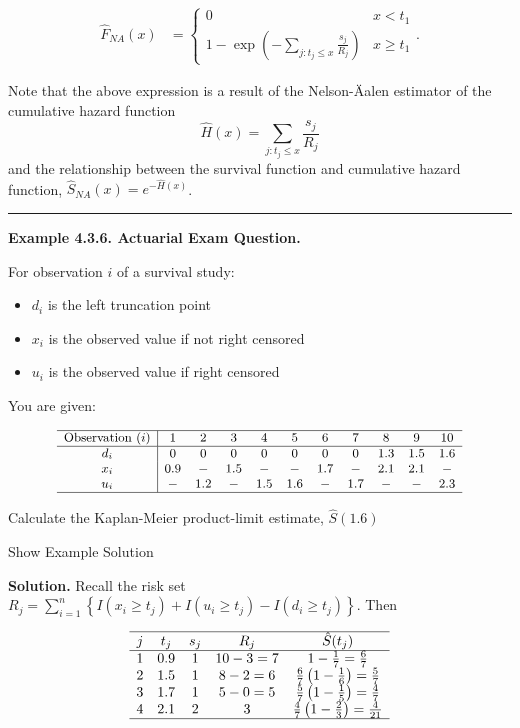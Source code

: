 \documentclass[]{book}
\providecommand{\tightlist}{%
  \setlength{\itemsep}{0pt}\setlength{\parskip}{0pt}}
\theoremstyle{definition}
\theoremstyle{definition}
\theoremstyle{definition}
\theoremstyle{remark}
\begin{document}
\[
\begin{aligned}
\hat{F}_{NA}(x) &=
\left\{
\begin{array}{ll}
0 & x<t_{1} \\
1- \exp \left(-\sum_{j:t_{j} \leq x}\frac{s_j}{R_j} \right) & x \geq t_{1} 
\end{array}
\right. .\end{aligned}
\]

Note that the above expression is a result of the Nelson-Äalen estimator
of the cumulative hazard function
\[\hat{H}(x)=\sum_{j:t_j\leq x}  \frac{s_j}{R_j} \] and the relationship
between the survival function and cumulative hazard function,
\(\hat{S}_{NA}(x)=e^{-\hat{H}(x)}\).

\begin{center}\rule{0.5\linewidth}{\linethickness}\end{center}

\textbf{Example 4.3.6. Actuarial Exam Question.}

For observation \(i\) of a survival study:

\begin{itemize}
\tightlist
\item
  \(d_i\) is the left truncation point
\item
  \(x_i\) is the observed value if not right censored
\item
  \(u_i\) is the observed value if right censored
\end{itemize}

You are given:

\[
{\small
\begin{array}{c|cccccccccc}
\hline
\text{Observation } (i) & 1 & 2 & 3 & 4 & 5 & 6 & 7 & 8 & 9 & 10\\ \hline
d_i & 0 & 0 & 0 & 0 & 0 & 0 & 0 & 1.3 & 1.5 & 1.6\\
x_i & 0.9 & - & 1.5 & - & - & 1.7 & - & 2.1 & 2.1 & - \\
u_i & - & 1.2 & - & 1.5 & 1.6 & - & 1.7 & - & - & 2.3 \\
\hline
\end{array}
}
\]

Calculate the Kaplan-Meier product-limit estimate, \(\hat{S}(1.6)\)

Show Example Solution

\hypertarget{toggleExampleSelect.3.6}{}
\textbf{Solution.} Recall the risk set
\(R_j = \sum_{i=1}^n \left\{ I(x_i \geq t_{j}) + I(u_i \geq t_{j}) - I(d_i \geq t_{j}) \right\}\).
Then

\[
\begin{array}{ccccc}
\hline
j & t_j & s_j & R_j & \hat{S}(t_j) \\
\hline
1  & 0.9   & 1   & 10-3 = 7 & 1-\frac{1}{7} = \frac{6}{7} \\
2  & 1.5   & 1   & 8-2 = 6  & \frac{6}{7}\left( 1 - \frac{1}{6} \right) = \frac{5}{7}\\
3  & 1.7   & 1   & 5-0 = 5  & \frac{5}{7}\left( 1 - \frac{1}{5} \right) = \frac{4}{7}\\
4  & 2.1   & 2   & 3        & \frac{4}{7}\left( 1 - \frac{2}{3}\right) = \frac{4}{21}\\
\hline
\end{array}
\]
\end{document}
